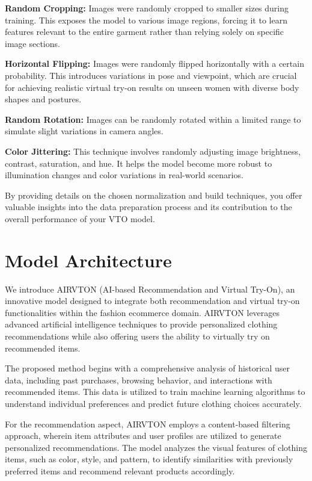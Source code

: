 \textbf{Random Cropping:} Images were randomly cropped to smaller sizes during training. This exposes the model to various image regions, forcing it to learn features relevant to the entire garment rather than relying solely on specific image sections.

\textbf{Horizontal Flipping:} Images were randomly flipped horizontally with a certain probability. This introduces variations in pose and viewpoint, which are crucial for achieving realistic virtual try-on results on unseen women with diverse body shapes and postures.

\textbf{Random Rotation:} Images can be randomly rotated within a limited range to simulate slight variations in camera angles.

\textbf{Color Jittering:} This technique involves randomly adjusting image brightness, contrast, saturation, and hue. It helps the model become more robust to illumination changes and color variations in real-world scenarios.

By providing details on the chosen normalization and build techniques, you offer valuable insights into the data preparation process and its contribution to the overall performance of your VTO model.

\section{Model Architecture}
We introduce AIRVTON (AI-based Recommendation and Virtual Try-On), an innovative model designed to integrate both recommendation and virtual try-on functionalities within the fashion ecommerce domain. AIRVTON leverages advanced artificial intelligence techniques to provide personalized clothing recommendations while also offering users the ability to virtually try on recommended items.

	The proposed method begins with a comprehensive analysis of historical user data, including past purchases, browsing behavior, and interactions with recommended items. This data is utilized to train machine learning algorithms to understand individual preferences and predict future clothing choices accurately.

	For the recommendation aspect, AIRVTON employs a content-based filtering approach, wherein item attributes and user profiles are utilized to generate personalized recommendations. The model analyzes the visual features of clothing items, such as color, style, and pattern, to identify similarities with previously preferred items and recommend relevant products accordingly.

